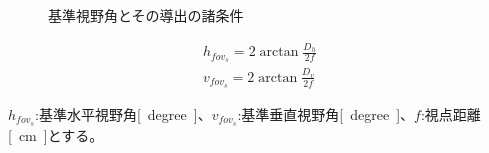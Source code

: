 \begin{figure}[h]
  \begin{center}
  \caption{基準視野角とその導出の諸条件}
  \label{taikan:kijuntods}
\end{center}
\end{figure}

\begin{align}
    h_{fov_s} = 2\arctan{\frac{D_h}{2f}} \label{taikan:eq:kijun1}\\
    v_{fov_s} = 2\arctan{\frac{D_v}{2f}} \label{taikan:eq:kijun2}
\end{align}

$h_{fov_s}$:基準水平視野角\si{[degree]}、$v_{fov_s}$:基準垂直視野角\si{[degree]}、$f$:視点距離\si{[cm]}とする。

